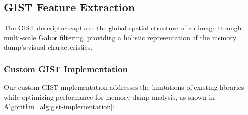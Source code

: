 \subsection{GIST Feature Extraction}
\label{subsec:gist-extraction}

The GIST descriptor captures the global spatial structure of an image through multi-scale Gabor filtering, providing a holistic representation of the memory dump's visual characteristics.

\subsubsection{Custom GIST Implementation}

Our custom GIST implementation addresses the limitations of existing libraries while optimizing performance for memory dump analysis, as shown in Algorithm~\ref{alg:gist-implementation}:

